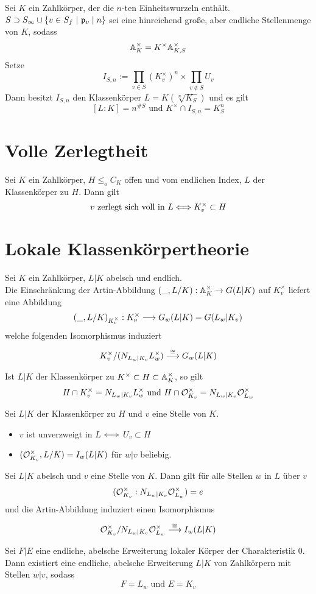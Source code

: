 \Satz{}
Sei $K$ ein Zahlkörper, der die $n$-ten Einheitswurzeln enthält. $S \supset S_\infty \cup \{ v \in S_f ~|~ \mathfrak{p}_v \mid n \}$ sei eine hinreichend große, aber endliche Stellenmenge von $K$, sodass
\[ \mathbb{A}_K^\times = K^\times \mathbb{A}_{K,S}^\times \]
Setze
\[ I_{S,n} := \prod_{v\in S} (K^\times_v)^n \times \prod_{v\not\in S}U_v \]
Dann besitzt $I_{S,n}$ den Klassenkörper $L = K(\sqrt[n]{K_S})$ und es gilt
\[ [L:K] = n^{\# S} \text{ und } K^\times \cap I_{S,n} =K_S^n \]

\section{Volle Zerlegtheit}
\Satz{}
Sei $K$ ein Zahlkörper, $H \leq_o C_K$ offen und vom endlichen Index, $L$ der Klassenkörper zu $H$. Dann gilt
\[ v \text{ zerlegt sich voll in }L \overset{}{\Longleftrightarrow} K_v^\times \subset H \]

\section{Lokale Klassenkörpertheorie}
\Satz{}
Sei $K$ ein Zahlkörper, $L|K$ abelsch und endlich.\\
Die Einschränkung der Artin-Abbildung $(\_, L/K) : \mathbb{A}_K^\times \overset{}{\rightarrow} G(L|K)$ auf $K_v^\times$ liefert eine Abbildung
\[ (\_, L/K)_{K_v^\times} : K_v^\times \overset{}{\longrightarrow} G_w(L|K) = G(L_w|K_v) \]
welche folgenden Isomorphismus induziert
\[ K_v^\times / (N_{L_w|K_v} L_w^\times) \overset{\overset{}{\cong}}{\longrightarrow} G_w(L|K) \]

\Kor{}
Ist $L|K$ der Klassenkörper zu $K^\times \subset H \subset \mathbb{A}_K^\times$, so gilt
\[ H\cap K^\times_v = N_{L_w|K_v}L_w^\times \text{ und } H \cap \mathcal{O}_{K_v}^\times = N_{L_w | K_v}\mathcal{O}_{L_w}^\times \]

\Satz{}
Sei $L|K$ der Klassenkörper zu $H$ und $v$ eine Stelle von $K$.
\begin{itemize}
\item $v$ ist unverzweigt in $L$ $\overset{}{\Longleftrightarrow}$ $U_v \subset H$
\item $(\mathcal{O}_{K_v}^\times, L/K) = I_w(L|K)$ für $w|v$ beliebig. 
\end{itemize}

\Kor{}
Sei $L|K$ abelsch und $v$ eine Stelle von $K$. Dann gilt für alle Stellen $w$ in $L$ über $v$
\[ (\mathcal{O}_{K_v}^\times: N_{L_w|K_v}\mathcal{O}_{L_w}^\times ) = e  \]
und die Artin-Abbildung induziert einen Isomorphismus
\[ \mathcal{O}_{K_v}^\times / N_{L_w|K_v}\mathcal{O}_{L_w}^\times \overset{\overset{}{\cong}}{\longrightarrow} I_w(L|K) \]

\Bem{}
Sei $F|E$ eine endliche, abelsche Erweiterung lokaler Körper der Charakteristik 0. Dann existiert eine endliche, abelsche Erweiterung $L|K$ von Zahlkörpern mit Stellen $w|v$, sodass
\[ F = L_w \text{ und } E = K_v \]

